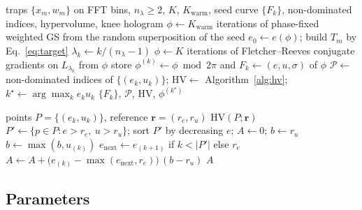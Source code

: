 \begin{algorithm}[t]
\caption{Curve by continuation of the weighted cost. Inputs are the traps with their weights, the number of weights $n_\lambda$, the conjugate-gradient iterations $K$ per weight, the start iterations $K_{\mathrm{warm}}$ and a seed.}
\label{alg:front}
\begin{algorithmic}[1]
\Require traps $\{x_m,w_m\}$ on FFT bins, $n_\lambda\ge2$, $K$, $K_{\mathrm{warm}}$, seed
\Ensure curve $\{F_k\}$, non-dominated indices, hypervolume, knee hologram
\State $\phi\gets K_{\mathrm{warm}}$ iterations of phase-fixed weighted GS from the random superposition of the seed
\State $e_0\gets e(\phi)$; build $T_m$ by Eq.~\ref{eq:target}
  \State $\lambda_k\gets k/(n_\lambda-1)$
  \State $\phi\gets K$ iterations of Fletcher--Reeves conjugate gradients on $L_{\lambda_k}$ from $\phi$ 
  \State store $\phi^{(k)}\gets\phi \bmod 2\pi$ and $F_k\gets(e,u,\sigma)$ of $\phi$ 
\EndFor
\State $\mathcal P\gets$ non-dominated indices of $\{(e_k,u_k)\}$; $\mathrm{HV}\gets$ Algorithm~\ref{alg:hv}; $k^\star\gets\arg\max_k e_ku_k$
\State \Return $\{F_k\}$, $\mathcal P$, $\mathrm{HV}$, $\phi^{(k^\star)}$
\end{algorithmic}
\end{algorithm}

\begin{algorithm}[t]
\caption{Hypervolume of a set of points in the plane $(e,u)$ by a sweep over the points sorted by efficiency, with the reference point $\mathbf r$. Points that are not above the reference in both coordinates are discarded.}
\label{alg:hv}
\begin{algorithmic}[1]
\Require points $P=\{(e_k,u_k)\}$, reference $\mathbf r=(r_e,r_u)$
\Ensure $\mathrm{HV}(P;\mathbf r)$
\State $P'\gets\{p\in P:e>r_e,\ u>r_u\}$; sort $P'$ by decreasing $e$; $A\gets0$; $b\gets r_u$
  \State $b\gets\max(b,u_{(k)})$ 
  \State $e_{\mathrm{next}}\gets e_{(k+1)}$ if $k<|P'|$ else $r_e$
  \State $A\gets A+\big(e_{(k)}-\max(e_{\mathrm{next}},r_e)\big)\,(b-r_u)$
\EndFor
\State \Return $A$
\end{algorithmic}
\end{algorithm}

\subsection{Parameters}\label{sec:parameters}

